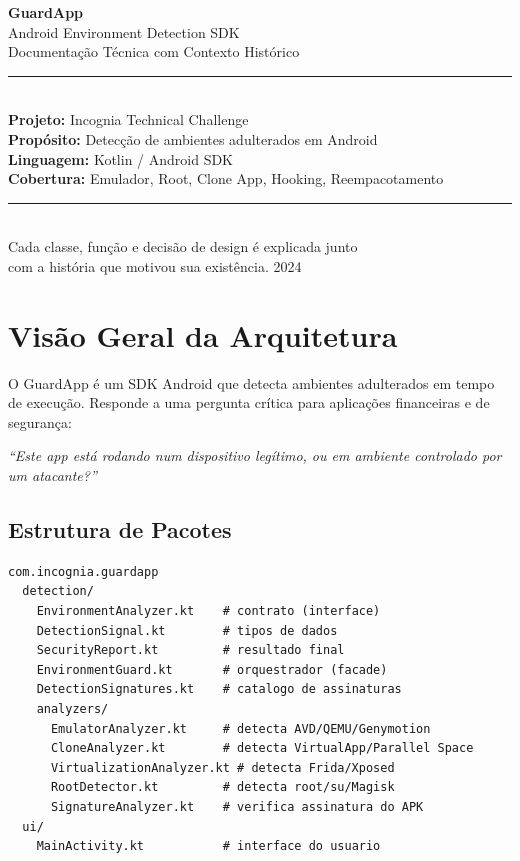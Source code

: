 \documentclass[12pt,a4paper]{article}
\begin{document}
\begin{titlepage}
  \centering
  \vspace*{2cm}
  {\Huge\bfseries\color{titlebg} GuardApp}\\[0.5cm]
  {\Large Android Environment Detection SDK}\\[0.3cm]
  {\large\color{comment} Documentação Técnica com Contexto Histórico}\\[2cm]
  \rule{\textwidth}{1pt}\\[0.5cm]
  {\normalsize
    \textbf{Projeto:} Incognia Technical Challenge\\[0.3cm]
    \textbf{Propósito:} Detecção de ambientes adulterados em Android\\[0.3cm]
    \textbf{Linguagem:} Kotlin / Android SDK\\[0.3cm]
    \textbf{Cobertura:} Emulador, Root, Clone App, Hooking, Reempacotamento
  }\\[2cm]
  \rule{\textwidth}{1pt}\\[1cm]
  {\small\color{comment}
    Cada classe, função e decisão de design é explicada junto\\
    com a história que motivou sua existência.
  }
  \vfill
  {\small 2024}
\end{titlepage}

\tableofcontents
\newpage

\section{Visão Geral da Arquitetura}

O GuardApp é um SDK Android que detecta ambientes adulterados em tempo de execução.
Responde a uma pergunta crítica para aplicações financeiras e de segurança:

\begin{center}
\textit{``Este app está rodando num dispositivo legítimo, ou em ambiente controlado por um atacante?''}
\end{center}

\subsection{Estrutura de Pacotes}

\begin{lstlisting}
com.incognia.guardapp
  detection/
    EnvironmentAnalyzer.kt    # contrato (interface)
    DetectionSignal.kt        # tipos de dados
    SecurityReport.kt         # resultado final
    EnvironmentGuard.kt       # orquestrador (facade)
    DetectionSignatures.kt    # catalogo de assinaturas
    analyzers/
      EmulatorAnalyzer.kt     # detecta AVD/QEMU/Genymotion
      CloneAnalyzer.kt        # detecta VirtualApp/Parallel Space
      VirtualizationAnalyzer.kt # detecta Frida/Xposed
      RootDetector.kt         # detecta root/su/Magisk
      SignatureAnalyzer.kt    # verifica assinatura do APK
  ui/
    MainActivity.kt           # interface do usuario
\end{lstlisting}
\end{document}
